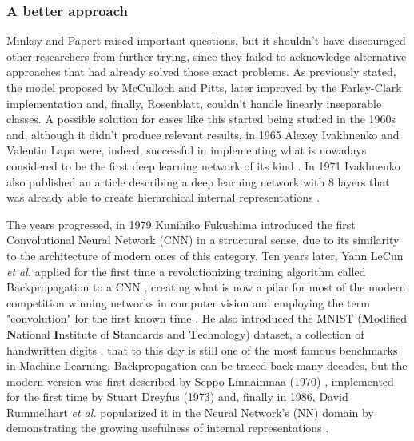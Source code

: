 \documentclass[a4paper, 12pt]{report}
\begin{document}
\subsubsection{A better approach}
Minksy and Papert raised important questions, but it shouldn't have discouraged other researchers from further trying, since they failed to acknowledge alternative approaches that had already solved those exact problems. As previously stated, the model proposed by McCulloch and Pitts, later improved by the Farley-Clark implementation and, finally, Rosenblatt, couldn't handle linearly inseparable classes. A possible solution for cases like this started being studied in the 1960s \autocite{josephContributionsPerceptronTheory1960,rosenblattPrinciplesNeurodynamicsPerceptrons1962} and, although it didn't produce relevant results, in 1965 Alexey Ivakhnenko and Valentin Lapa \autocite{ivakhnenkoCyberneticPredictingDevices} were, indeed, successful in implementing what is nowadays considered to be the first deep learning network of its kind \autocite{schmidhuberDeepLearningNeural2015}. In 1971 Ivakhnenko also published an article describing a deep learning network with 8 layers that was already able to create hierarchical internal representations \autocite{4308320}.
\par The years progressed, in 1979 Kunihiko Fukushima introduced the first Convolutional Neural Network (CNN) in a structural sense, due to its similarity to the architecture of modern ones of this category. Ten years later, Yann LeCun \textit{et al.} applied for the first time a revolutionizing training algorithm called Backpropagation to a CNN \autocite{6795724}, creating what is now a pilar for most of the modern competition winning networks in computer vision \autocite{schmidhuberDeepLearningNeural2015} and employing the term "convolution" for the first known time \autocite{liSurveyConvolutionalNeural2020}. He also introduced the MNIST (\textbf{M}odified \textbf{N}ational \textbf{I}nstitute of \textbf{S}tandards and \textbf{T}echnology) dataset, a collection of handwritten digits \autocite{lecunGradientBasedLearningApplied1998}, that to this day is still one of the most famous benchmarks in Machine Learning. Backpropagation can be traced back many decades, but the modern version was first described by Seppo Linnainmaa (1970) \autocite{linnainmaa1970representation}, implemented for the first time by Stuart Dreyfus (1973) \autocite{Dreyfus1973383} and, finally in 1986, David Rummelhart \textit{et al.} popularized it in the Neural Network's (NN) domain by demonstrating the growing usefulness of internal representations \autocite{rumelhart1986learning}.
\end{document}
